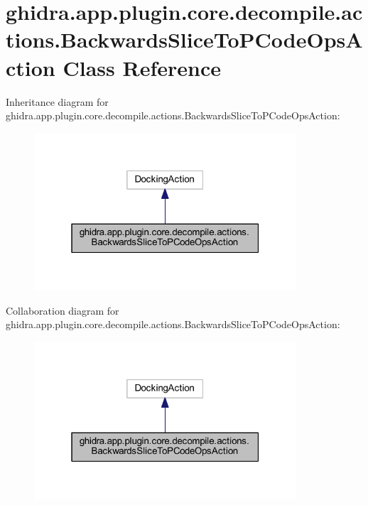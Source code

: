 \hypertarget{classghidra_1_1app_1_1plugin_1_1core_1_1decompile_1_1actions_1_1_backwards_slice_to_p_code_ops_action}{}\section{ghidra.\+app.\+plugin.\+core.\+decompile.\+actions.\+Backwards\+Slice\+To\+P\+Code\+Ops\+Action Class Reference}
\label{classghidra_1_1app_1_1plugin_1_1core_1_1decompile_1_1actions_1_1_backwards_slice_to_p_code_ops_action}


Inheritance diagram for ghidra.\+app.\+plugin.\+core.\+decompile.\+actions.\+Backwards\+Slice\+To\+P\+Code\+Ops\+Action\+:
\nopagebreak
\begin{figure}[H]
\begin{center}
\leavevmode
\includegraphics[width=277pt]{classghidra_1_1app_1_1plugin_1_1core_1_1decompile_1_1actions_1_1_backwards_slice_to_p_code_ops_action__inherit__graph}
\end{center}
\end{figure}


Collaboration diagram for ghidra.\+app.\+plugin.\+core.\+decompile.\+actions.\+Backwards\+Slice\+To\+P\+Code\+Ops\+Action\+:
\nopagebreak
\begin{figure}[H]
\begin{center}
\leavevmode
\includegraphics[width=277pt]{classghidra_1_1app_1_1plugin_1_1core_1_1decompile_1_1actions_1_1_backwards_slice_to_p_code_ops_action__coll__graph}
\end{center}
\end{figure}
